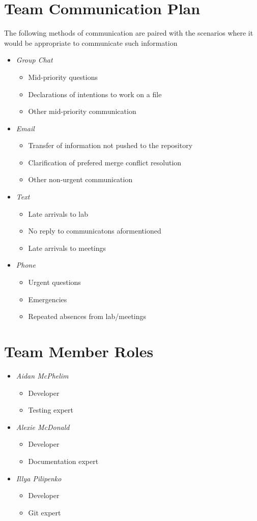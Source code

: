 \documentclass{article}
\begin{document}
\section{Team Communication Plan}
The following methods of communication are paired with the scenarios where it would be appropriate to communicate such information
\begin{itemize}
\item{\textit{Group Chat}}
\begin{itemize}
\item{Mid-priority questions}
\item{Declarations of intentions to work on a file}
\item{Other mid-priority communication}
\end{itemize}
\item{\textit{Email}}
\begin{itemize}
\item{Transfer of information not pushed to the repository}
\item{Clarification of prefered merge conflict resolution}
\item{Other non-urgent communication}
\end{itemize}
\item{\textit{Text}}
\begin{itemize}
\item{Late arrivals to lab}
\item{No reply to communicatons aformentioned}
\item{Late arrivals to meetings}
\end{itemize}
\item{\textit{Phone}}
\begin{itemize}
\item{Urgent questions}
\item{Emergencies}
\item{Repeated absences from lab/meetings}
\end{itemize}
\end{itemize}

\section{Team Member Roles}
\begin{itemize}
\item{\textit{Aidan McPhelim}}
\begin{itemize}
\item{Developer}
\item{Testing expert}
\end{itemize}
\item{\textit{Alexie McDonald}}
\begin{itemize}
\item{Developer}
\item{Documentation expert}
\end{itemize}
\item{\textit{Illya Pilipenko}}
\begin{itemize}
\item{Developer}
\item{Git expert}
\end{itemize}
\end{itemize}
\end{document}
